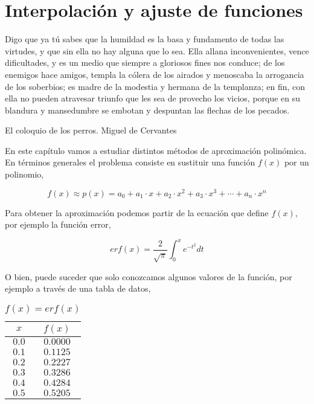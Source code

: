 \chapter{Interpolación y ajuste de funciones}\label{interpolacion}

\epigraph{Digo que ya tú sabes que la humildad es la basa y fundamento de todas las virtudes, y que sin ella no hay alguna que lo sea. Ella allana inconvenientes, vence dificultades, y es un medio que siempre a gloriosos fines nos conduce; de los enemigos hace amigos, templa la cólera de los airados y menoscaba la arrogancia de los soberbios; es madre de la modestia y hermana de la templanza; en fin, con ella no pueden atravesar triunfo que les sea de provecho los vicios, porque en su blandura y mansedumbre se embotan y despuntan las flechas de los pecados.}{El coloquio de los perros. Miguel de Cervantes}


\begin{paracol}{2}
En este capítulo vamos a estudiar distintos métodos de aproximación polinómica. En términos generales el problema consiste en sustituir una función $f(x)$ por un polinomio,
\end{paracol}
\begin{equation*}
f(x)\approx p(x)=a_0+a_1\cdot x+a_2\cdot x^2+a_3\cdot x^3+\cdots +a_n \cdot x^n
\end{equation*}
\begin{paracol}{2}
Para obtener la aproximación podemos partir de la ecuación que define $f(x)$,  por ejemplo la función error,
\end{paracol}
\begin{equation*}
erf(x)=\frac{2}{\sqrt{\pi}}\int_0^x e^{-t^2}dt
\end{equation*}
\begin{paracol}{2}
O bien, puede suceder que solo conozcamos algunos valores de la función, por ejemplo a través de una tabla de datos,
\end{paracol}
\begin{table}[h]
\caption{$f(x)=erf(x)$}
\centering
\begin{tabular}{c|c}
$x$&$f(x)$\\ 
\hline
$0.0$& $0.0000$\\
$0.1$&$0.1125$\\
$0.2$&$0.2227$\\
$0.3$&$0.3286$\\
$0.4$&$0.4284$\\
$0.5$&$0.5205$\\
\end{tabular}
\label{tpuntos2}
\end{table}

